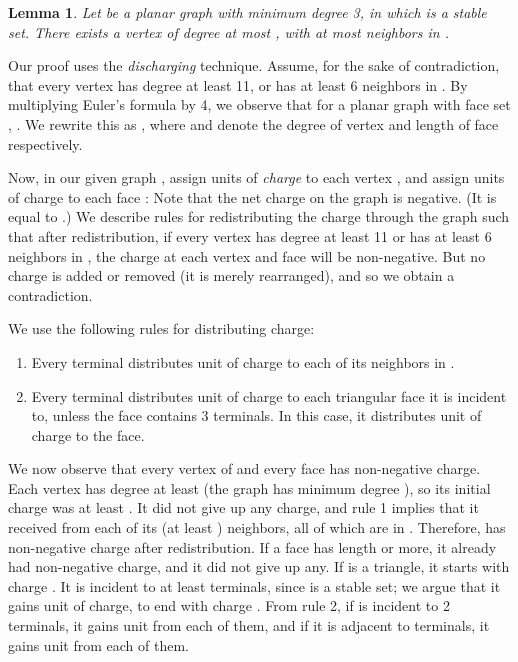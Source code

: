 \documentclass[11pt]{article}
\newtheorem{lemma}{Lemma}[section]
\renewenvironment{proof}{\vspace{-0.1in}\noindent{\bf Proof:}}{\hspace*{\fill}\par}
\begin{document}
\begin{lemma}\label{lem:discharging}
  Let  be a planar graph with minimum degree 3, in
  which  is a stable set. There exists a vertex  of
  degree at most , with at most  neighbors in . 
\end{lemma}
\begin{proof}
  Our proof uses the \emph{discharging} technique. Assume, for the
  sake of contradiction, that every vertex  has degree at
  least 11, or has at least 6 neighbors in . By multiplying Euler's
  formula by 4, we observe that for a planar graph  with face
  set ,  . We rewrite this as
  , where  and  denote the degree of
  vertex  and length of face  respectively.

  Now, in our given graph , assign  units of
  \emph{charge} to each vertex , and assign 
  units of charge to each face : Note that the net charge on the
  graph is negative. (It is equal to .) We describe rules for
  redistributing the charge through the graph such that after
  redistribution, if every vertex  has degree at least 11 or
  has at least 6 neighbors in , the charge at each vertex and face
  will be non-negative. But no charge is added or removed (it is merely
  rearranged), and so we obtain a contradiction.

  \bigskip \noindent
  We use the following rules for distributing charge:
  \begin{enumerate}
    \item Every terminal  distributes  unit of charge to
      each of its neighbors in .
    \item Every terminal  distributes  unit of charge to
      each triangular face  it is incident to, unless the face
      contains 3 terminals. In this case, it distributes  unit of
      charge to the face.
  \end{enumerate}

  We now observe that every vertex of  and every face has
  non-negative charge. Each vertex  has degree at least 
  (the graph has minimum degree ), so its initial charge was at
  least . It did not give up any charge, and rule 1 implies that
  it received  from each of its (at least ) neighbors, all of
  which are in . Therefore,  has non-negative charge after
  redistribution. If a face  has length  or more, it already had
  non-negative charge, and it did not give up any. If  is a
  triangle, it starts with charge . It is incident to at least 
  terminals, since  is a stable set; we argue that it gains 
  unit of charge, to end with charge . From rule 2, if  is
  incident to 2 terminals, it gains  unit from each of them, and
  if it is adjacent to  terminals, it gains  unit from each of
  them. 


\end{proof}
\end{document}
